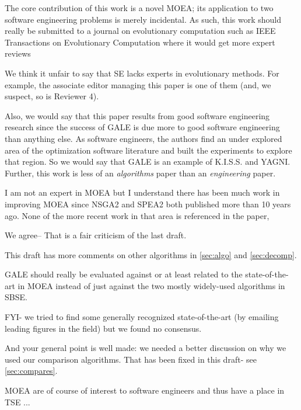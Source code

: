 \documentclass[10pt,journal,compsoc]{IEEEtran}
\newcommand{\tion}[1]{\textsection\ref{sec:#1}}
\newenvironment{changed}{\par}{\par}
\begin{document}
The core contribution of this work is a novel MOEA;
its application to two software engineering problems
is merely incidental. As such, this work should
really be submitted to a journal on evolutionary
computation such as IEEE Transactions on
Evolutionary Computation where it would get more
expert reviews
\begin{changed}
We think it unfair to say that SE lacks  experts in evolutionary
methods. For example, the associate editor managing
this paper is one of them (and, we suspect,
so is Reviewer 4).

Also, we would say that this paper results from good software
engineering research since
the success
of GALE is due more to good software engineering than
anything else.
As software engineers,
the authors find an under explored area of the optimization
software literature and built the experiments to explore
that region.  
So we would say that GALE is an example of K.I.S.S. and YAGNI.
Further,  this work is less of an {\em algorithms} paper
than an {\em engineering} paper. 


\end{changed}


I am not an expert in MOEA but I
understand there has been much work in improving
MOEA since NSGA2 and SPEA2 both published more than
10 years ago. None of the more recent work in that
area is referenced in the paper,

\begin{changed}
We agree-- That is a  fair criticism of the last draft. 

This draft has more comments on other algorithms in 
\tion{algo} and
\tion{decomp}.
\end{changed}

GALE should
really be evaluated against or at least related to
the state-of-the-art in MOEA instead of just against
the two mostly widely-used algorithms in SBSE.

\begin{changed}
FYI- we tried to find some generally recognized state-of-the-art
(by emailing leading figures in the field) but we found no consensus.

And your general point is well made: we needed a better
discussion on why we used our comparison algorithms.
That has been fixed in this draft- see  \tion{compares}.
\end{changed}

 MOEA are of course of interest to software engineers
and thus have a place in TSE ...
\end{document}
